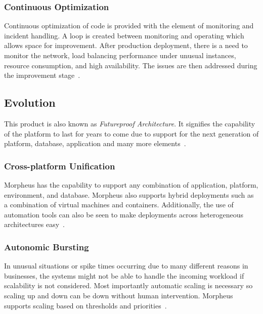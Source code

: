 \subsubsection{Continuous Optimization}

Continuous optimization of code is provided with the element of monitoring and 
incident handling. A loop is created between monitoring and operating 
which allows space for improvement. After production deployment, there is a 
need to monitor the network, load balancing performance under unusual 
instances, resource consumption, and high availability. The issues are then 
addressed during the improvement 
stage~\cite{hid-sp18-416-www-morpheus-automation}.

\subsection{Evolution}

This product is also known as \textit{Futureproof Architecture}. It signifies 
the capability of the platform to last for years to come due to support for 
the next generation of platform, database, application and many more 
elements~\cite{hid-sp18-416-www-morpheus-product-guide}.

\subsubsection{Cross-platform Unification}

Morpheus has the capability to support any combination of application, 
platform, environment, and database. Morpheus also supports hybrid deployments 
such as a combination of virtual machines and containers. Additionally, the use 
of automation tools can also be seen to make deployments across heterogeneous 
architectures easy~\cite{hid-sp18-416-www-morpheus-architecture}.

\subsubsection{Autonomic Bursting}

In unusual situations or spike times occurring due to many different reasons in 
businesses, the systems might not be able to handle the incoming workload if 
scalability is not considered. Most importantly automatic scaling is necessary 
so scaling up and down can be down without human intervention. Morpheus 
supports scaling based on thresholds and 
priorities~\cite{hid-sp18-416-www-morpheus-architecture}.


